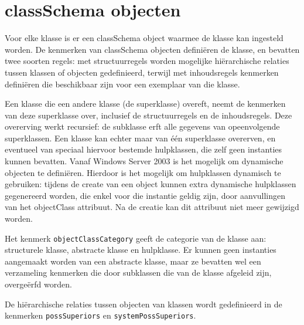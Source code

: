 	\section{classSchema objecten }
	\begin{enumerate}
		 { 
			 Voor elke klasse is er een classSchema object waarmee de klasse kan ingesteld worden. De kenmerken van classSchema objecten definiëren de klasse, en bevatten twee soorten regels: met structuurregels worden mogelijke hiërarchische relaties tussen klassen of objecten gedefinieerd, terwijl met inhoudsregels kenmerken definiëren die beschikbaar zijn voor een exemplaar van die klasse.	
		}
		
		 {
			 Een klasse die een andere klasse (de superklasse) overeft, neemt de kenmerken van deze superklasse over, inclusief de structuurregels en de inhoudsregels. Deze overerving werkt recursief: de subklasse erft alle gegevens van opeenvolgende superklassen. Een klasse kan echter maar van één superklasse overerven, en eventueel van speciaal hiervoor bestemde hulpklassen, die zelf geen instanties kunnen bevatten. Vanaf Windows Server 2003 is het mogelijk om dynamische objecten te definiëren. Hierdoor is het mogelijk om hulpklassen dynamisch te gebruiken: tijdens de create van een object kunnen extra dynamische hulpklassen gegenereerd worden, die enkel voor die instantie geldig zijn, door aanvullingen van het objectClass attribuut. Na de creatie kan dit attribuut niet meer gewijzigd worden.

				Het kenmerk \texttt{objectClassCategory} geeft de categorie van de klasse aan: structurele klasse, abstracte klasse en hulpklasse. Er kunnen geen instanties aangemaakt worden van een abstracte klasse, maar ze bevatten wel een verzameling kenmerken die door subklassen die van de klasse afgeleid zijn, overgeërfd worden. 

				De hiërarchische relaties tussen objecten van klassen wordt gedefinieerd in de kenmerken \texttt{possSuperiors} en \texttt{systemPossSuperiors}. 
				
		}
		

\end{enumerate}
